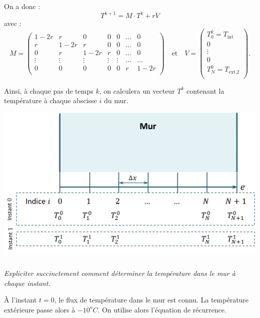 \documentclass[10pt,fleqn]{article} %
\begin{document}
\begin{multicols}{2}
\begin{corrige}
On a donc : 
$$
T^{k+1} = M \cdot T^k + rV
$$
avec :
$$
M = 
\begin{pmatrix}
1-2r & r     & 0 & 0 & 0 &  \ldots & 0 \\
r     & 1-2r & r & 0 & 0  & \ldots &  0 \\
0    & r & 1-2r & r & 0   & \ldots&  0 \\
\vdots & \vdots & \vdots & \vdots & \vdots & \ldots & \ldots \\
0& 0& 0& 0& 0& r & 1-2r\\
\end{pmatrix}
\quad \text{et} \quad 
V = \begin{pmatrix}
T_0^k = T_{\text{int}} \\
0 \\
\vdots \\
0 \\
T_N^k = T_{\text{ext,2}} \\
\end{pmatrix}.
$$
\end{corrige}
\else
\fi
\ifprof
\else
\vspace{.5cm}
Ainsi, à chaque pas de temps $k$, on calculera un vecteur $T^k$ contenant la température à chaque abscisse $i$ du mur.

\begin{center}
\includegraphics[width=\linewidth]{images/figure_03}
\end{center}
\fi

\subparagraph{}
\textit{Expliciter succinctement comment déterminer la température dans le mur à chaque instant.}
\ifprof
\begin{corrige}
\`A l'instant $t=0$, le flux de température dans le mur est connu. La température extérieure passe alors à $-10^o C$. On utilise alors l'équation de récurrence.


\end{corrige}
\end{multicols}
\end{document}
